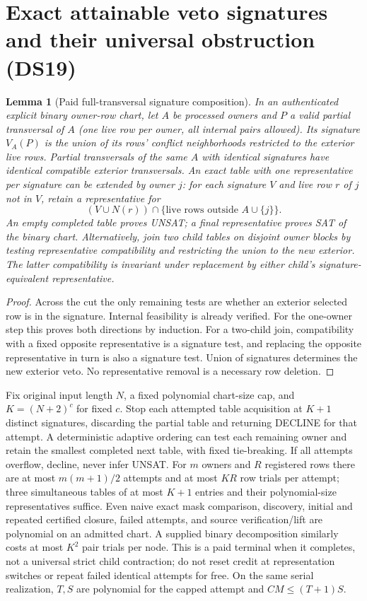 \documentclass[11pt]{article}
\newtheorem{lemma}[theorem]{Lemma}
\begin{document}
\section{Exact attainable veto signatures and their universal obstruction (DS19)}\label{sec:ds19}
\begin{lemma}[Paid full-transversal signature composition]\label{lem:ds19-veto}
In an authenticated explicit binary owner-row chart, let $A$ be processed owners and $P$ a valid partial transversal of $A$ (one live row per owner, all internal pairs allowed). Its signature $V_A(P)$ is the union of its rows' conflict neighborhoods restricted to the exterior live rows. Partial transversals of the same $A$ with identical signatures have identical compatible exterior transversals. An exact table with one representative per signature can be extended by owner $j$: for each signature $V$ and live row $r$ of $j$ not in $V$, retain a representative for
\[
 (V\cup N(r))\cap\{\text{live rows outside }A\cup\{j\}\}.
\]
An empty completed table proves UNSAT; a final representative proves SAT of the binary chart. Alternatively, join two child tables on disjoint owner blocks by testing representative compatibility and restricting the union to the new exterior. The latter compatibility is invariant under replacement by either child's signature-equivalent representative.
\end{lemma}
\begin{proof}
Across the cut the only remaining tests are whether an exterior selected row is in the signature. Internal feasibility is already verified. For the one-owner step this proves both directions by induction. For a two-child join, compatibility with a fixed opposite representative is a signature test, and replacing the opposite representative in turn is also a signature test. Union of signatures determines the new exterior veto. No representative removal is a necessary row deletion.
\end{proof}
Fix original input length $N$, a fixed polynomial chart-size cap, and $K=(N+2)^c$ for fixed $c$. Stop each attempted table acquisition at $K+1$ distinct signatures, discarding the partial table and returning DECLINE for that attempt. A deterministic adaptive ordering can test each remaining owner and retain the smallest completed next table, with fixed tie-breaking. If all attempts overflow, decline, never infer UNSAT. For $m$ owners and $R$ registered rows there are at most $m(m+1)/2$ attempts and at most $KR$ row trials per attempt; three simultaneous tables of at most $K+1$ entries and their polynomial-size representatives suffice. Even naive exact mask comparison, discovery, initial and repeated certified closure, failed attempts, and source verification/lift are polynomial on an admitted chart. A supplied binary decomposition similarly costs at most $K^2$ pair trials per node. This is a paid terminal when it completes, not a universal strict child contraction; do not reset credit at representation switches or repeat failed identical attempts for free. On the same serial realization, $T,S$ are polynomial for the capped attempt and $CM\le(T+1)S$.
\end{document}
